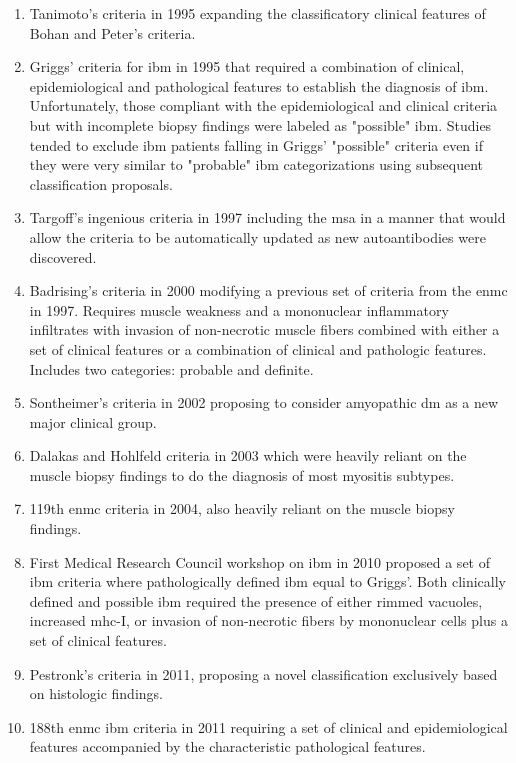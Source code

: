 \begin{enumerate}
	\item Tanimoto's criteria in 1995\cite{Tanimoto1995} expanding the classificatory clinical features of Bohan and Peter's criteria.
	
	\item Griggs' criteria for \gls{ibm} in 1995\cite{Griggs1995} that required a combination of clinical, epidemiological and pathological features to establish the diagnosis of \gls{ibm}. Unfortunately, those compliant with the epidemiological and clinical criteria but with incomplete biopsy findings were labeled as "possible" \gls{ibm}. Studies tended to exclude \gls{ibm} patients falling in Griggs' "possible" criteria even if they were very similar to "probable" \gls{ibm} categorizations using subsequent classification proposals.
	
	\item Targoff's ingenious criteria in 1997\cite{Targoff1997} including the \gls{msa} in a manner that would allow the criteria to be automatically updated as new autoantibodies were discovered.
	
	\item Badrising's criteria in 2000\cite{Badrising2000} modifying a previous set of criteria from the \gls{enmc} in 1997.\cite{Emery1997} Requires muscle weakness and a mononuclear inflammatory infiltrates with invasion of non-necrotic muscle fibers combined with either a set of clinical features or a combination of clinical and pathologic features. Includes two categories: probable and definite.
	
	\item Sontheimer's criteria in 2002\cite{Sontheimer2002} proposing to consider amyopathic \gls{dm} as a new major clinical group.
	
	\item Dalakas and Hohlfeld criteria in 2003\cite{Dalakas2003} which were heavily reliant on the muscle biopsy findings to do the diagnosis of most myositis subtypes.
	
	\item 119th \gls{enmc} criteria in 2004,\cite{Hoogendijk2004} also heavily reliant on the muscle biopsy findings.
	
	\item First Medical Research Council workshop on \gls{ibm} in 2010\cite{HiltonJones2010} proposed a set of \gls{ibm} criteria where pathologically defined \gls{ibm} equal to Griggs'. Both clinically defined and possible \gls{ibm} required the presence of either rimmed vacuoles, increased \gls{mhc}-I, or invasion of non-necrotic fibers by mononuclear cells plus a set of clinical features.
	
	\item Pestronk's criteria in 2011,\cite{Pestronk2011} proposing a novel classification exclusively based on histologic findings.
	
	\item 188th \gls{enmc} \gls{ibm} criteria in 2011\cite{Rose2013} requiring a set of clinical and epidemiological features accompanied by the characteristic pathological features.
\end{enumerate}

